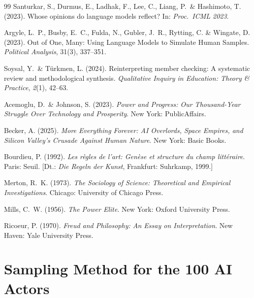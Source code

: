 \documentclass[12pt,a4paper]{article}
\begin{document}
\begin{thebibliography}{99}
  Santurkar, S., Durmus, E., Ladhak, F., Lee, C., Liang, P.~\& Hashimoto, T. (2023).
  Whose opinions do language models reflect?
  In: \textit{Proc.\ ICML 2023}.

  Argyle, L.~P., Busby, E.~C., Fulda, N., Gubler, J.~R., Rytting, C. \& Wingate, D. (2023).
  Out of One, Many: Using Language Models to Simulate Human Samples.
  \textit{Political Analysis}, 31(3), 337--351.

  Soysal, Y.~\& T\"urkmen, L. (2024).
  Reinterpreting member checking: A systematic review and methodological synthesis.
  \textit{Qualitative Inquiry in Education: Theory \& Practice}, \textit{2}(1), 42--63.

  Acemoglu, D.~\& Johnson, S. (2023).
  \textit{Power and Progress: Our Thousand-Year Struggle Over Technology and Prosperity}.
  New York: PublicAffairs.

  Becker, A. (2025).
  \textit{More Everything Forever: AI Overlords, Space Empires, and Silicon Valley's Crusade Against Human Nature}.
  New York: Basic Books.

  Bourdieu, P. (1992).
  \textit{Les r\`egles de l'art: Gen\`ese et structure du champ litt\'eraire}.
  Paris: Seuil.
  [Dt.: \textit{Die Regeln der Kunst}, Frankfurt: Suhrkamp, 1999.]

  Merton, R.~K. (1973).
  \textit{The Sociology of Science: Theoretical and Empirical Investigations}.
  Chicago: University of Chicago Press.

  Mills, C.~W. (1956).
  \textit{The Power Elite}.
  New York: Oxford University Press.

  Ricoeur, P. (1970).
  \textit{Freud and Philosophy: An Essay on Interpretation}.
  New Haven: Yale University Press.

\end{thebibliography}



\newpage
\appendix

\section{Sampling Method for the 100 AI Actors}
\label{app:sampling}
\end{document}
